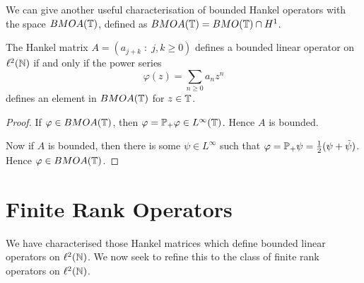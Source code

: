\documentclass{unswmaths}
\begin{document}
    We can give another useful characterisation of bounded Hankel operators 
    with the space ${BMOA}(\mathbb{T})$, defined as ${BMOA}(\mathbb{T}) = {BMO}(\mathbb{T})\cap H^1$.
    \begin{lemma}
        The Hankel matrix $A = (a_{j+k}\;:\;j,k\geq 0)$ defines a bounded linear operator on $\ell^2(\mathbb{N})$
        if and only if the power series
        \begin{equation*}
            \varphi(z) = \sum_{n\geq 0}a_n z^n
        \end{equation*}
        defines an element in ${BMOA}(\mathbb{T})$ for $z \in \mathbb{T}$.
    \end{lemma}
    \begin{proof}
        If $\varphi \in {BMOA}(\mathbb{T})$, then $\varphi = \mathbb{P}_+\varphi \in L^\infty(\mathbb{T})$. Hence
        $A$ is bounded.
        
        Now if $A$ is bounded, then there is some $\psi \in L^\infty$ such that $\varphi = \mathbb{P}_+\psi = \frac{1}{2}(\psi+\tilde{\psi})$.
        Hence $\varphi \in {BMOA}(\mathbb{T})$.
    \end{proof}
    
    \section*{Finite Rank Operators}
        We have characterised those Hankel matrices which define bounded linear operators
        on $\ell^2(\mathbb{N})$. We now seek to refine this to the class of finite rank operators
        on $\ell^2(\mathbb{N})$.
    

    

    
\end{document}
